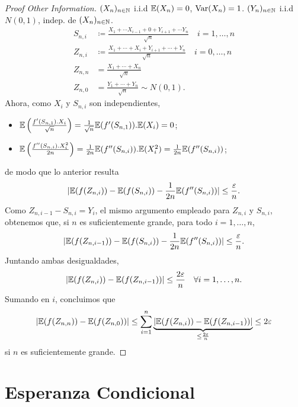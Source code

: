 
\begin{proof}[Proof Other Information]
	$(X_{n})_{n \in \mathbb{N}}$ i.i.d $\mathbb{E}(X_{n}) = 0$, $\operatorname{Var}(X_{n}) = 1$. $(Y_{n})_{n \in \mathbb{N}}$ i.i.d $N(0,1)$, indep. de $(X_{n})_{n \in \mathbb{N}}$.
	\begin{align*}
		S_{n,i} &\coloneq \frac{X_{1} + \cdots X_{i - 1} + 0 + Y_{i + 1} + \cdots Y_{n}}{\sqrt{n}} \quad i = 1, \dots, n \\
		Z_{n,i} &\coloneq \frac{X_{1} + \cdots + X_{i} + Y_{i + 1} + \cdots + Y_{n}}{\sqrt{n}} \quad i = 0, \dots, n \\
		Z_{n,n} &= \frac{X_{1} + \cdots + X_{n}}{\sqrt{n}} \\
		Z_{n,0} &= \frac{Y_{1} + \cdots + Y_{n}}{\sqrt{n}} \sim N(0,1)
	.\end{align*}
	Ahora, como $X_{i}$ y $S_{n,i}$ son independientes,
	\begin{itemize}
		\item $\mathbb{E} \left( \frac{f'(S_{n,1}) . X_{i}}{\sqrt{n}} \right) = \frac{1}{\sqrt{n}} \mathbb{E}(f'(S_{n,1})) . \mathbb{E}(X_{i}) = 0$;

		\item $\mathbb{E} \left( \frac{f''(S_{n,i}) . X_{i}^{2}}{2n} \right) = \frac{1}{2n} \mathbb{E}(f''(S_{n,i})) . \mathbb{E}(X_{i}^{2}) = \frac{1}{2n} \mathbb{E}(f''(S_{n,i}))$;
	\end{itemize}
	de modo que lo anterior resulta
	\[ |\mathbb{E}(f(Z_{n,i})) - \mathbb{E}(f(S_{n,i})) - \frac{1}{2n} \mathbb{E}(f''(S_{n,i}))| \leq \frac{\varepsilon}{n}. \]
	Como $Z_{n,i-1} - S_{n,i} = Y_{i}$, el mismo argumento empleado para $Z_{n,i}$ y $S_{n,i}$, obtenemos que, si $n$ es suficientemente grande,  para todo $i = 1,\dots,n$,
	\[ |\mathbb{E}(f(Z_{n,i-1})) - \mathbb{E}(f(S_{n,i})) - \frac{1}{2n}\mathbb{E}(f''(S_{n,i}))| \leq \frac{\varepsilon}{n}. \]
	Juntando ambas desigualdades,
	\[ |\mathbb{E}(f(Z_{n,i})) - \mathbb{E}(f(Z_{n,i-1}))| \leq \frac{2\varepsilon}{n} \quad \forall i = 1,\dots,n. \]
	Sumando en $i$, concluimos que
	\[ |\mathbb{E}(f(Z_{n,n})) - \mathbb{E}(f(Z_{n,0}))| \leq \sum_{i=1}^{n} \underbrace{|\mathbb{E}(f(Z_{n,i})) - \mathbb{E}(f(Z_{n,i-1}))|}_{\leq \frac{2\varepsilon}{n}} \leq 2\varepsilon \]
	si $n$ es suficientemente grande.
\end{proof}

\chapter{Esperanza Condicional}

